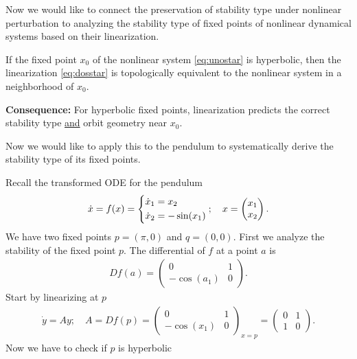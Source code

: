 Now we would like to connect the preservation of stability type under nonlinear perturbation to analyzing the stability type of fixed points of nonlinear dynamical systems based on their linearization. 
\begin{theorem}
	If the fixed point ${x_0} $ of the nonlinear system \eqref{eq:unostar} is hyperbolic, then the linearization \eqref{eq:dosstar} is topologically equivalent to the nonlinear system in a neighborhood of ${x_0} $. 

	\textbf{Consequence:} For hyperbolic fixed points, linearization predicts the correct stability type \underline{and} orbit geometry near ${x_0} $. 
\end{theorem}
Now we would like to apply this to the pendulum to systematically derive the stability type of its fixed points.
\begin{ex}
	Recall the transformed ODE for the pendulum
	\begin{align}
		\dot{x}=f(x)=
		\begin{dcases}
		\dot{x}_{1} = x_2 \\ \dot{x}_2 = -\sin(x_1)	
		\end{dcases}
		;\quad {x}  = 
		\begin{pmatrix}
			x_1 \\ x_2
		\end{pmatrix}
		.
	\end{align}
	We have two fixed points ${p} =(\pi ,0)$ and ${q} = (0,0)$. First we analyze the stability of the fixed point ${p} $. The differential of $f$ at a point $a$ is
\begin{align}
	Df(a) =  
		\begin{pmatrix}
			0 & 1 \\
			-\cos(a_1) & 0
		\end{pmatrix}.
\end{align}
	Start by linearizing at ${p} $ 
	\begin{align}
		\dot{{y} } = {Ay};\quad {A}  = Df({p} ) = 
		\begin{pmatrix}
			0 & 1 \\
			- \cos(x_1) & 0
		\end{pmatrix}_{{x} = {p} } =
		\begin{pmatrix}
			0 & 1 \\ 1 & 0
		\end{pmatrix}.
	\end{align}
	Now we have to check if ${p} $ is hyperbolic
	\begin{align}

\end{align}
\end{ex}
